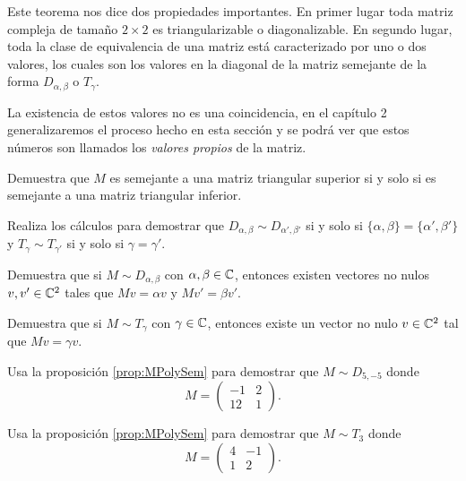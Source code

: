 Este teorema nos dice dos propiedades importantes. En primer lugar toda matriz compleja de tamaño $2 \times 2$ es triangularizable o diagonalizable. En segundo lugar, toda la clase de equivalencia de una matriz está caracterizado por uno o dos valores, los cuales son los valores en la diagonal de la matriz semejante de la forma $D_{\alpha,\beta}$ o $T_\gamma$.

La existencia de estos valores no es una coincidencia, en el capítulo 2 generalizaremos el proceso hecho en esta sección y se podrá ver que estos números son llamados los \emph{valores propios} de la matriz.


\ExerciseSection

\begin{exerciselist}
  \item Demuestra que $M$ es semejante a una matriz triangular superior si y solo si es semejante a una matriz triangular inferior.
  
  \item Realiza los cálculos para demostrar que $D_{\alpha,\beta} \sim D_{\alpha',\beta'}$ si y solo si $\{\alpha,\beta\} = \{\alpha',\beta'\}$ y $T_\gamma \sim T_{\gamma'}$ si y solo si $\gamma = \gamma'$.

  \item Demuestra que si $M \sim D_{\alpha,\beta}$ con $\alpha,\beta \in \mathbb{C}$, entonces existen vectores no nulos $v, v' \in \mathbb{C}^2$ tales que $Mv = \alpha v$ y $Mv' = \beta v'$.
  
  \item Demuestra que si $M \sim T_\gamma$ con $\gamma \in \mathbb{C}$, entonces existe un vector no nulo $v\in \mathbb{C}^2$ tal que $Mv = \gamma v$.
  
  \item Usa la proposición \ref{prop:MPolySem} para demostrar que $M \sim D_{5, -5}$ donde
    \[ M = \begin{pmatrix}
      -1 & 2 \\
      12 & 1
    \end{pmatrix}. \]
  
  \item Usa la proposición \ref{prop:MPolySem} para demostrar que $M \sim T_{3}$ donde
  \[ M = \begin{pmatrix}
    4 & -1 \\
    1 & 2
  \end{pmatrix}. \]
\end{exerciselist}